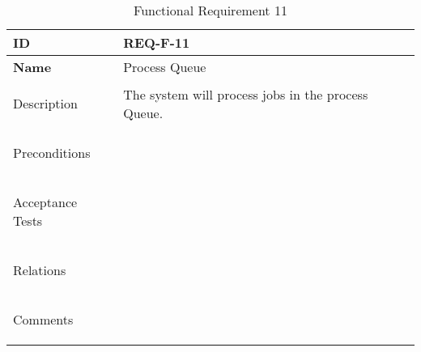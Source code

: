 \begin{table}[H]
    \begin{tabular}[t]{ | >{\bfseries}l | p{9.5cm} |}

    \hline
    ID
    &  REQ-F-11 \\ \hline

    Name
    & Process Queue \\ \hline

    Description
    & The system will process jobs in the process Queue. \\ \hline

    Preconditions
    &  \\ \hline

    Acceptance Tests
    & \\ \hline

    Relations
    &  \\ \hline

    Comments
    &  \\ \hline

    \end{tabular}

    \caption{Functional Requirement 11}
    \label{fig:req_f_11}

\end{table}